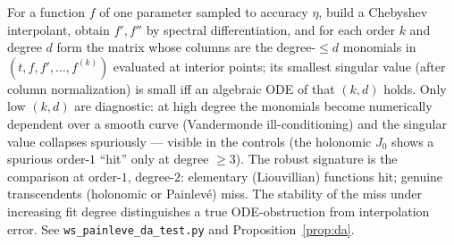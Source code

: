 \documentclass[11pt]{article}
\theoremstyle{definition}
\theoremstyle{remark}
\begin{document}
For a function $f$ of one parameter sampled to accuracy $\eta$, build a Chebyshev interpolant,
obtain $f',f''$ by spectral differentiation, and for each order $k$ and degree $d$ form the
matrix whose columns are the degree-$\le d$ monomials in $(t,f,f',\dots,f^{(k)})$ evaluated at
interior points; its smallest singular value (after column normalization) is small iff an
algebraic ODE of that $(k,d)$ holds. Only low $(k,d)$ are diagnostic: at high degree the
monomials become numerically dependent over a smooth curve (Vandermonde ill-conditioning) and
the singular value collapses spuriously --- visible in the controls (the holonomic $J_0$ shows
a spurious order-$1$ ``hit'' only at degree $\ge3$). The robust signature is the comparison at
order-$1$, degree-$2$: elementary (Liouvillian) functions hit; genuine transcendents
(holonomic or Painlev\'e) miss. The stability of the miss under increasing fit degree
distinguishes a true ODE-obstruction from interpolation error. See
\texttt{ws\_painleve\_da\_test.py} and Proposition~\ref{prop:da}.
\end{document}
